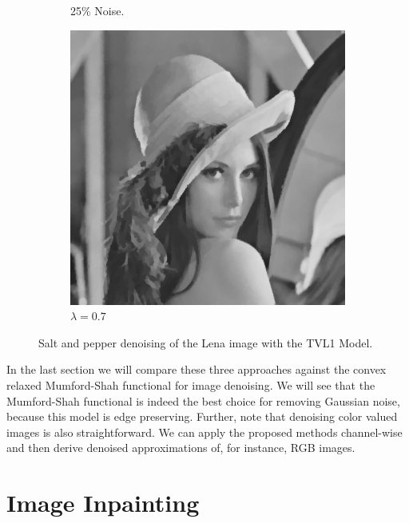 \documentclass[abstracton]{scrreprt}
\begin{document}
\begin{figure}[!ht]
\begin{subfigure}[b]{0.31\textwidth}
                    \caption{25\% Noise.}
                \end{subfigure}
                \begin{subfigure}[b]{0.31\textwidth}
                    \includegraphics[width=\textwidth]{img/denoising/salt_and_pepper_noise/07lena.png}
                    \caption{$\lambda = 0.7$}
                \end{subfigure}
                \caption[Salt and pepper denoising example: TVL1.]{Salt and pepper denoising of the Lena image with the TVL1 Model.}
            \label{fig:denoising_lena_tvl1_sap}
            \end{figure}

        In the last section we will compare these three approaches against the convex relaxed Mumford-Shah functional for image denoising. We will see that the Mumford-Shah functional is indeed the best choice for removing Gaussian noise, because this model is edge preserving. Further, note that denoising color valued images is also straightforward. We can apply the proposed methods channel-wise and then derive denoised approximations of, for instance, RGB images.


    \section{Image Inpainting} %
    \label{sec:image_inpainting}
\end{document}
